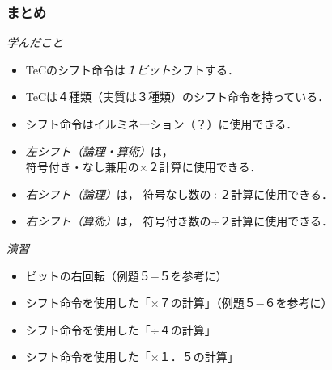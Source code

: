 \documentclass[handout]{beamer}        %
\begin{document}
\begin{frame}
  \frametitle{まとめ}
  \emph{学んだこと}
  \begin{itemize}
  \item TeCのシフト命令は\emph{１ビット}シフトする．
  \item TeCは４種類（実質は３種類）のシフト命令を持っている．
  \item シフト命令はイルミネーション（？）に使用できる．
  \item \emph{左シフト（論理・算術）}は，\\
    符号付き・なし兼用の×２計算に使用できる．
  \item \emph{右シフト（論理）}は，
    符号なし数の÷２計算に使用できる．
  \item \emph{右シフト（算術）}は，
    符号付き数の÷２計算に使用できる．
  \end{itemize}
  \vfill
  \emph{演習}
  \begin{itemize}
  \item ビットの右回転（例題５−５を参考に）
  \item シフト命令を使用した「×７の計算」（例題５−６を参考に）
  \item シフト命令を使用した「÷４の計算」
  \item シフト命令を使用した「×１．５の計算」
  \end{itemize}
  \vfill
\end{frame}
\end{document}
